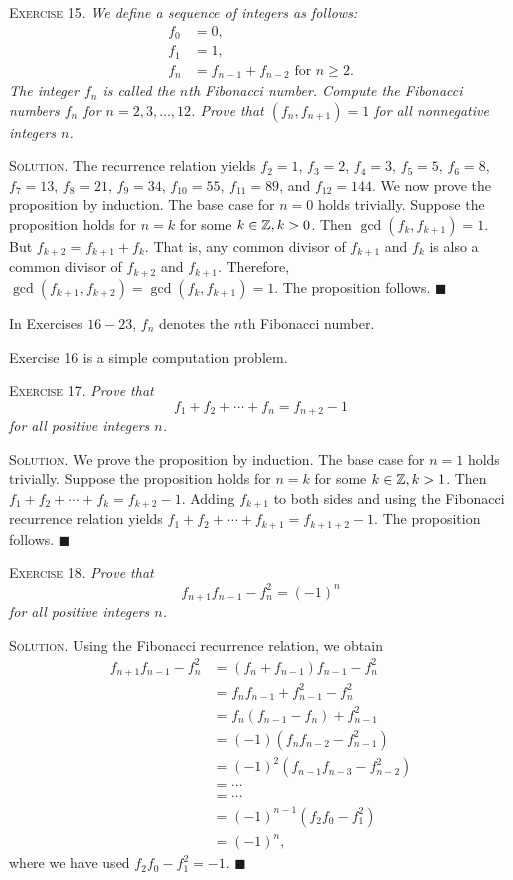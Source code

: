 \documentclass[11pt, leqno]{article}
\newcommand{\done}{\ensuremath{\blacksquare}}
\begin{document}
\textsc{Exercise 15}. \emph{We define a sequence of integers as follows: 
\begin{align*}
  f_0 &= 0,\\
  f_1 &= 1,\\
  f_n &= f_{n-1} + f_{n-2} \text{ for } n\geq 2.
\end{align*}The integer $f_n$ is called the $n$th Fibonacci number. Compute the Fibonacci numbers $f_n$ for $n= 2,3,\ldots, 12$. Prove that $(f_n, f_{n+1}) = 1$ for all nonnegative integers $n$.}

\textsc{Solution}. The recurrence relation yields $f_2=1$, $f_3=2$, $f_4=3$, $f_5 = 5$, $f_6 = 8$, $f_7 = 13$, $f_8 = 21$, $f_9 = 34$, $f_{10} = 55$, $f_{11} = 89$, and $f_{12} = 144$. We now prove the proposition by induction. The base case for $n=0$ holds trivially. Suppose the proposition holds for $n=k$ for some $k\in\mathbb{Z}, k>0$. Then $\gcd(f_k, f_{k+1}) = 1$. But $f_{k+2} = f_{k+1} + f_k$. That is, any common divisor of $f_{k+1}$ and $f_k$ is also a common divisor of $f_{k+2}$ and $f_{k+1}$. Therefore, $\gcd(f_{k+1}, f_{k+2}) = \gcd(f_k, f_{k+1}) = 1$. The proposition follows. \done

In Exercises $16-23$, $f_n$ denotes the $n$th Fibonacci number.

Exercise 16 is a simple computation problem.

\textsc{Exercise 17}. \emph{Prove that 
\begin{displaymath}
f_1 + f_2 + \cdots + f_n = f_{n+2} - 1
\end{displaymath}
for all positive integers $n$.}

\textsc{Solution}. We prove the proposition by induction. The base case for $n=1$ holds trivially. Suppose the proposition holds for $n=k$ for some $k\in\mathbb{Z}, k>1$. Then $f_1 + f_2 + \cdots + f_k = f_{k+2} - 1$. Adding $f_{k+1}$ to both sides and using the Fibonacci recurrence relation yields $f_1 + f_2 + \cdots + f_{k+1} = f_{k+1+2} - 1$. The proposition follows. \done

\textsc{Exercise 18}. \emph{Prove that 
\begin{displaymath}
f_{n+1}f_{n-1} - f_n^2 = (-1)^n
\end{displaymath}
for all positive integers $n$.}

\textsc{Solution}. Using the Fibonacci recurrence relation, we obtain 
\begin{align*}
  f_{n+1}f_{n-1} - f_n^2 &= (f_n+f_{n-1})f_{n-1} - f_n^2 \\
                         &= f_nf_{n-1} + f_{n-1}^2 - f_n^2 \\
                         &= f_n(f_{n-1} - f_n) + f_{n-1}^2 \\
                         &= (-1)(f_nf_{n-2} - f_{n-1}^2) \\
                         &= (-1)^2(f_{n-1}f_{n-3} - f_{n-2}^2) \\
                         &= \cdots \\
                         &= \cdots \\
                         &= (-1)^{n-1}(f_2f_0 - f_1^2) \\
  &= (-1)^n,
\end{align*}
where we have used $f_2f_0-f_1^2 = -1$. \done
\end{document}
